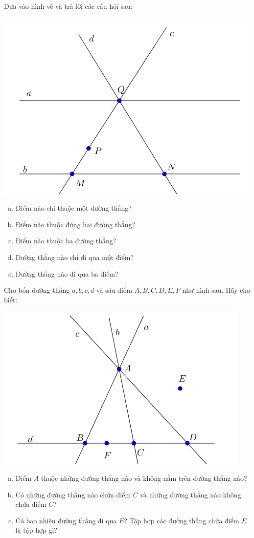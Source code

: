 \newpage
\begin{bt}
Dựa vào hình vẽ và trả lời các câu hỏi sau:
\begin{center}
\includegraphics[scale=0.65]{img/bai1_c3}
\end{center}
\begin{enumerate}[a)]
\item	Điểm nào chỉ thuộc một đường thẳng? 
\item	Điểm nào thuộc đúng hai đường thẳng?
\item	Điểm nào thuộc ba đường thẳng?
\item	Đường thẳng nào chỉ đi qua một điểm?
\item	Đường thẳng nào đi qua ba điểm?
\end{enumerate}
\end{bt}   \begin{bt}
Cho bốn đường thẳng $a, b, c, d$ và sáu điểm $A, B, C, D, E, F$ như hình sau. Hãy cho biết:
\begin{center}
\includegraphics[scale=0.65]{img/bai1_c4}
\end{center}
\begin{enumerate}[a)]
\item	Điểm $A$ thuộc những đường thẳng nào và không nằm trên đường thẳng nào?
\item	Có những đường thẳng nào chứa điểm $C$ và những đường thẳng nào không chứa điểm $C$?
\item	Có bao nhiêu đường thẳng đi qua $E$? Tập hợp các đường thẳng chứa điểm $E$ là tập hợp gì?                       
\end{enumerate}

\end{bt}
